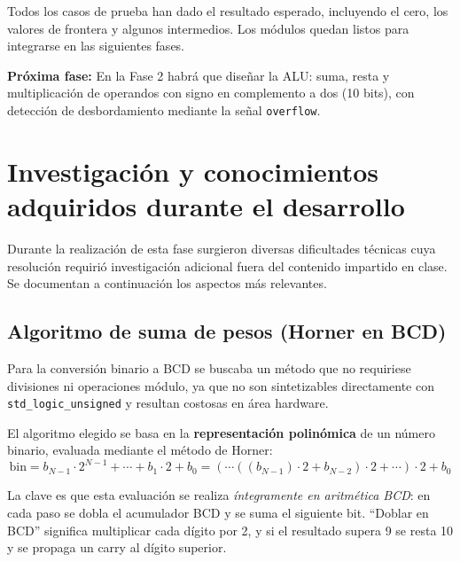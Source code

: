 \documentclass[memoria_final]{subfiles}
\begin{document}
	Todos los casos de prueba han dado el resultado esperado, incluyendo el cero, los valores de frontera y algunos intermedios. Los módulos quedan listos para integrarse en las siguientes fases.
	
	\vspace{1em}
	\begin{tcolorbox}[colback=SoftBlue, colframe=MainBlue, boxrule=0.8pt, arc=2pt,
		left=0.5cm, right=0.5cm, top=0.3cm, bottom=0.3cm]
		\small\faArrowRight\enspace\textbf{Próxima fase:}
		En la Fase 2 habrá que diseñar la ALU: suma, resta y multiplicación de operandos
		con signo en complemento a dos (10 bits), con detección de desbordamiento
		mediante la señal \texttt{overflow}.
	\end{tcolorbox}

	\newpage
	\appendix
	\section{Investigación y conocimientos adquiridos durante el desarrollo}

	Durante la realización de esta fase surgieron diversas dificultades técnicas cuya resolución requirió investigación adicional fuera del contenido impartido en clase. Se documentan a continuación los aspectos más relevantes.

	\subsection{Algoritmo de suma de pesos (Horner en BCD)}

	Para la conversión binario a BCD se buscaba un método que no requiriese divisiones
	ni operaciones módulo, ya que no son sintetizables directamente con
	\texttt{std\_logic\_unsigned} y resultan costosas en área hardware.

	El algoritmo elegido se basa en la \textbf{representación polinómica} de un número
	binario, evaluada mediante el método de Horner:
	$$\text{bin} = b_{N-1} \cdot 2^{N-1} + \cdots + b_1 \cdot 2 + b_0
	= (\cdots((b_{N-1}) \cdot 2 + b_{N-2}) \cdot 2 + \cdots) \cdot 2 + b_0$$

	La clave es que esta evaluación se realiza \textit{íntegramente en aritmética BCD}:
	en cada paso se dobla el acumulador BCD y se suma el siguiente bit. ``Doblar en BCD''
	significa multiplicar cada dígito por 2, y si el resultado supera 9 se resta 10 y se
	propaga un carry al dígito superior.
\end{document}
